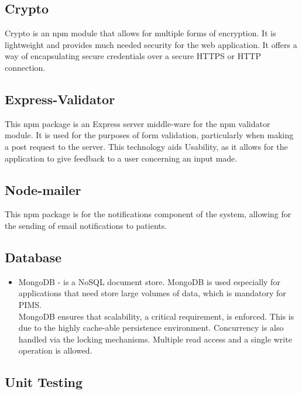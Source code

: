 \subsection{Crypto}
Crypto is an npm module that allows for multiple forms of encryption. It is lightweight and provides much needed security for the web application. It offers a way of encapsulating secure credentials over a secure HTTPS or HTTP connection.

\subsection{Express-Validator}
This npm package is an Express server middle-ware for the npm validator module. It is used for the purposes of form validation, particularly when making a post request to the server. This technology aids Usability, as it allows for the application to give feedback to a user concerning an input made.

\subsection{Node-mailer}
This npm package is for the notifications component of the system, allowing for the sending of email notifications to patients.
	
\subsection{Database}
\begin{itemize}
	\item MongoDB - is a NoSQL document store. MongoDB is used especially for applications that need store large volumes of data, which is mandatory for PIMS. \\
	MongoDB ensures that scalability, a critical requirement, is enforced. This is due to the highly cache-able persistence environment. Concurrency is also handled  via the locking mechanisms. Multiple read access and a single write operation is allowed.
\end{itemize}

\subsection{Unit Testing}
